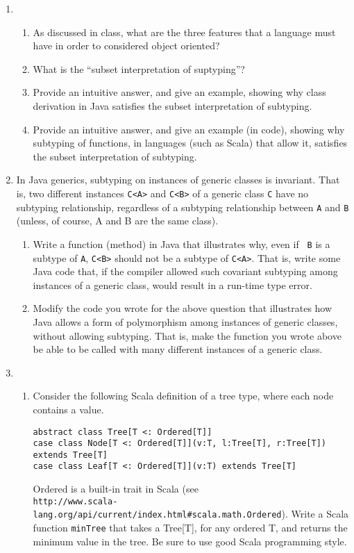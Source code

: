 \documentclass[11pt]{article}
\begin{document}
\begin{enumerate}
\item 
\begin{enumerate} 
\item 
As discussed in class, what are the three features that a language must have in order to considered object oriented?

\item What is the ``subset interpretation of suptyping''?

\item Provide an intuitive answer, and give an example, showing why class derivation in Java satisfies the subset interpretation of subtyping.


\item Provide an intuitive answer, and give an example (in code), showing why subtyping of functions, in languages (such as Scala) that allow it, satisfies the subset interpretation of subtyping.


\end{enumerate}

\item 
In Java generics, subtyping on instances of generic classes is invariant.  That is, two different
instances {\tt C<A>} and {\tt C<B>} of a generic class {\tt C} have no subtyping relationship, 
regardless of a subtyping relationship between {\tt A} and {\tt B} (unless, of course, A and 
B are the same class). 
\begin{enumerate} 
\item
Write a function (method) in Java that illustrates why, even if {\tt
  B} is a subtype of {\tt A}, {\tt C<B>} should not be a subtype of
{\tt C<A>}.  That is, write some Java code that, if the compiler
allowed such covariant subtyping among instances of a generic class,
would result in a run-time type error.

\item 
Modify the code you wrote for the above question that illustrates how
Java allows a form of polymorphism among instances of generic classes,
without allowing subtyping. That is, make the function you wrote 
above be able to be called with many different instances of a generic class.

\end{enumerate} 

\item 
\begin{enumerate} 
\item
Consider the following Scala definition of a tree type, where each
node contains a value.
\begin{verbatim} 
abstract class Tree[T <: Ordered[T]]
case class Node[T <: Ordered[T]](v:T, l:Tree[T], r:Tree[T]) extends Tree[T]
case class Leaf[T <: Ordered[T]](v:T) extends Tree[T]
\end{verbatim} 
Ordered is a built-in trait in Scala (see\\ 
\mbox{\tt http://www.scala-lang.org/api/current/index.html\#scala.math.Ordered}). Write a Scala function
\mbox{\tt minTree} that takes a Tree[T], for any ordered T, and 
returns the minimum value in the tree.  Be sure to use good Scala 
programming style.


\end{enumerate}
\end{enumerate}
\end{document}
